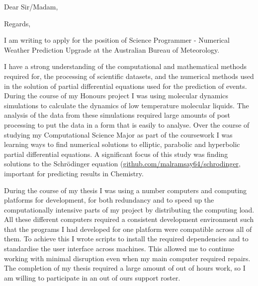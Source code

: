 


\recipient{~}{~}
\date{\today}
\opening{Dear Sir/Madam,}
\closing{Regards,}



\makelettertitle

I am writing to apply for the position of Science Programmer - Numerical Weather Prediction Upgrade at the Australian Bureau of Meteorology.


I have a strong understanding of the computational and mathematical methods required for, the processing of scientific datasets, and the numerical methods used in the solution of partial differential equations used for the prediction of events. During the course of my Honours project I was using molecular dynamics simulations to calculate the dynamics of low temperature molecular liquids. The analysis of the data from these simulations required large amounts of post processing to put the data in a form that is easily to analyse. Over the course of studying my Computational Science Major as part of the coursework I was learning ways to find numerical solutions to elliptic, parabolic and hyperbolic partial differential equations. A significant focus of this study was finding solutions to the Schr\"odinger equation (\href{https://github.com/malramsay64/schrodinger}{github.com/malramsay64/schrodinger}, important for predicting results in Chemistry.


During the course of my thesis I was using a number computers and computing platforms for development, for both redundancy and to speed up the computationally intensive parts of my project by distributing the computing load. All these different computers required a consistent development environment such that the programs I had developed for one platform were compatible across all of them. To achieve this I wrote scripts to install the required dependencies and to standardise the user interface across machines. This allowed me to continue working with minimal disruption even when my main computer required repairs. The completion of my thesis required a large amount of out of hours work, so I am willing to participate in an out of ours support roster.


